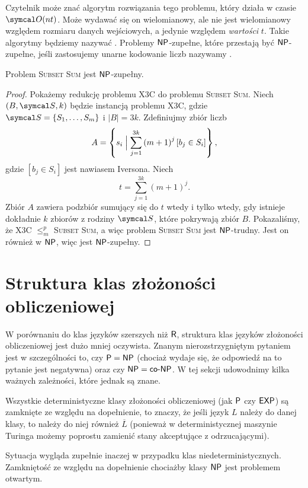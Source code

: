Czytelnik może znać algorytm rozwiązania tego problemu, który działa w czasie $\sO(nt)$. Może wydawać się on wielomianowy, ale nie jest wielomianowy względem rozmiaru danych wejściowych, a jedynie względem \textit{wartości} $t$. Takie algorytmy będziemy nazywać . Problemy $\textsf{NP}$-zupełne, które przestają być $\textsf{NP}$-zupełne, jeśli zastosujemy unarne kodowanie liczb nazywamy .

\begin{theorem}
    Problem \textsc{Subset Sum} jest $\textsf{NP}$-zupełny.
\end{theorem}
\begin{proof}
    Pokażemy redukcję problemu X3C do problemu \textsc{Subset Sum}. Niech $(B, \sS, k)$ będzie instancją problemu X3C, gdzie $\sS = \{S_1, \ldots, S_m\}$ i $|B| = 3k$. Zdefiniujmy zbiór liczb
    \[ A = \left\{s_i \Bigm| \sum_{j=1}^{3k} \left(m + 1\right)^j \left[b_j \in S_i\right]\right\}, \]
    gdzie $\left[b_j \in S_i\right]$ jest nawiasem Iversona. Niech
    \[ t = \sum_{j=1}^{3k} (m + 1)^j. \]
    Zbiór $A$ zawiera podzbiór sumujący się do $t$ wtedy i tylko wtedy, gdy istnieje dokładnie $k$ zbiorów z rodziny $\sS$, które pokrywają zbiór $B$.
    Pokazaliśmy, że X3C $\leq_m^p$ \textsc{Subset Sum}, a więc problem \textsc{Subset Sum} jest $\textsf{NP}$-trudny. Jest on również w $\textsf{NP}$, więc jest $\textsf{NP}$-zupełny.
\end{proof}

\section{Struktura klas złożoności obliczeniowej}

W porównaniu do klas języków szerszych niż $\textsf{R}$, struktura klas języków złożoności obliczeniowej jest dużo mniej oczywista. Znanym nierozstrzygniętym pytaniem jest w szczególności to, czy $\textsf{P} = \textsf{NP}$ (chociaż wydaje się, że odpowiedź na to pytanie jest negatywna) oraz czy $\textsf{NP} = \textsf{co-NP}$.
W tej sekcji udowodnimy kilka ważnych zależności, które jednak są znane.

\begin{remark}\label{r:classes closed under complement}
    Wszystkie deterministyczne klasy złożoności obliczeniowej (jak $\textsf{P}$ czy $\textsf{EXP}$) są zamknięte ze względu na dopełnienie, to znaczy, że jeśli język $L$ należy do danej klasy, to należy do niej również $\overline{L}$ (ponieważ w deterministycznej maszynie Turinga możemy poprostu zamienić stany akceptujące z odrzucającymi).

    Sytuacja wygląda zupełnie inaczej w przypadku klas niedeterministycznych. Zamkniętość ze względu na dopełnienie chociażby klasy $\textsf{NP}$ jest problemem otwartym.
\end{remark}

